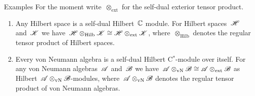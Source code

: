 \documentclass[b]{subfiles}
\begin{document}
\begin{parsec}
\begin{point}{Examples}%
For the moment write~$\otimes_{\text{ext}}$ for the self-dual exterior
    tensor product.
\begin{enumerate}
\item
Any Hilbert space is a self-dual Hilbert~$\mathbb{C}$ module.
For Hilbert spaces~$\mathscr{H}$ and~$\mathscr{K}$
    we have~$\mathscr{H} \otimes_{\text{Hilb}} \mathscr{K}
        \cong \mathscr{H} \otimes_{\text{ext}} \mathscr{K}$,
    where~$\otimes_{\text{Hilb}}$ denotes the regular tensor product of
    Hilbert spaces.
\item
Every von Neumann algebra is a self-dual Hilbert C$^*$-module
    over itself.
For any von Neumann algebras~$\mathscr{A}$ and~$\mathscr{B}$
    we have~$\mathscr{A}\otimes_{\text{vN}} \mathscr{B}
        \cong \mathscr{A} \otimes_{\text{ext}} \mathscr{B}$
        as Hilbert~$\mathscr{A}\otimes_{\text{vN}} \mathscr{B}$-modules,
        where~$\mathscr{A}\otimes_{\text{vN}}\mathscr{B}$ denotes the regular
        tensor product of von Neumann algebras.
\end{enumerate}
\end{point}
\end{parsec}
\end{document}

